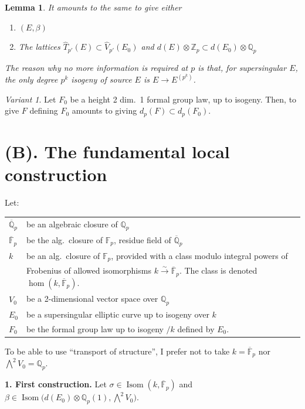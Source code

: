 \documentclass[11pt,a4paper]{article}
\theoremstyle{plain}
\newtheorem{lemma}[theorem]{Lemma}
\theoremstyle{definition}
\theoremstyle{remark}
\newtheorem*{variant}{Variant}
\DeclareMathOperator{\Isom}{Isom}
\newcommand{\F}{\mathbb{F}}
\newcommand{\Qpbar}{\overline{\mathbb{Q}}_{p}}
\newcommand{\Fpbar}{\overline{\mathbb{F}}_{p}}
\newcommand{\Zp}{\mathbb{Z}_{p}}
\newcommand{\Qp}{\mathbb{Q}_{p}}
\begin{document}
\begin{lemma}
It amounts to the same to give either
\begin{enumerate}[label=(\alph*)]
\item $(E, \beta)$
\item The lattices $\widehat{T}_{p'}(E) \subset \widehat{V}_{p'}(E_{0})$ and $d(E) \otimes \Zp \subset d(E_{0}) \otimes \Qp$
\end{enumerate}
The reason why no more information is required at $p$ is that, for supersingular $E$, the only degree $p^{k}$ isogeny of source $E$ is $E \to E^{(p^{k})}$.
\end{lemma}

\begin{variant}
Let $F_{0}$ be a height 2 dim.\ 1 formal group law, up to isogeny. Then, to give $F$ defining $F_{0}$ amounts to giving $d_{p}(F) \subset d_{p}(F_{0})$.
\end{variant}


\section*{(B). The fundamental local construction}

\noindent
Let:
\begin{center}
\begin{tabular}{@{}ll@{}}
$\Qpbar$ & be an algebraic closure of $\Qp$ \\
$\Fpbar$ & be the alg.\ closure of $\F_{p}$, residue field of $\Qpbar$ \\
$k$ & be an alg.\ closure of $\F_{p}$, provided with a class modulo integral powers of \\
& Frobenius of allowed isomorphisms $k \xrightarrow{\sim} \Fpbar$. The class is denoted $\hom(k, \Fpbar)$. \\
$V_{0}$ & be a 2-dimensional vector space over $\Qp$ \\
$E_{0}$ & be a supersingular elliptic curve up to isogeny over $k$ \\
$F_{0}$ & be the formal group law up to isogeny $/k$ defined by $E_{0}$.
\end{tabular}
\end{center}

To be able to use ``transport of structure'', I prefer not to take $k = \Fpbar$ nor $\bigwedge^{2} V_{0} = \Qp$.

\medskip

\noindent
\textbf{1. First construction.} Let $\sigma \in \Isom(k, \Fpbar)$ and $\beta \in \Isom\bigl(d(E_{0}) \otimes \Qp(1), \bigwedge^{2} V_{0}\bigr)$.
\end{document}
